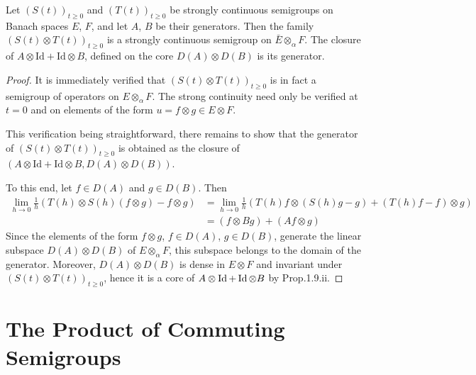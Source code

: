 \begin{proposition}\label{prop:a1-3.7}
Let $(S(t))_{t\geq 0}$ and $(T(t))_{t\geq 0}$ be strongly continuous semigroups on Banach spaces $E$, $F$, and let $A$, $B$ be their generators. 
Then the family $(S(t) \otimes T(t))_{t\geq 0}$ is a strongly continuous semigroup on $\bar{E} \otimes_{\alpha} F$.
The closure of $A \otimes \text{Id} + \text{Id} \otimes B$, defined on the core $D(A) \otimes D(B)$ is its generator.
\end{proposition}
\begin{proof}
It is immediately verified that $(S(t)\otimes T(t))_{t\geq 0}$ is in fact a semigroup of operators on $E \otimes_{\alpha} F$. 
The strong continuity need only be verified at $t = 0$ and on elements of the form $u = f \otimes g \in E \otimes F$.

This verification being straightforward, there remains to show that the generator of $(S(t)\otimes T(t))_{t\geq 0}$ is obtained as the closure of $(A \otimes \text{Id} + \text{Id} \otimes B,D(A) \otimes D(B))$.

To this end, let $f \in D(A)$ and $g \in D(B)$. 
Then
\begin{align*}
    \lim_{h\to 0} \frac{1}{h}(T(h) \otimes S(h)(f \otimes g)-f \otimes g) &= \lim_{h\to 0} \frac{1}{h}(T(h)f \otimes (S(h)g-g) + (T(h)f-f) \otimes g) \\
    &= (f \otimes Bg) + (Af \otimes g)
\end{align*}
Since the elements of the form $f \otimes g$, $f \in D(A)$, $g \in D(B)$, generate the linear subspace $D(A) \otimes D(B)$ of $E \otimes_{\alpha} F$, this subspace belongs
to the domain of the generator.
Moreover, $D(A) \otimes D(B)$ is dense in $E \otimes F$ and invariant under $(S(t)\otimes T(t))_{t\geq 0}$, hence it is a core of $A \otimes \operatorname{Id} + \operatorname{Id} \otimes B$ by Prop.1.9.ii.
\end{proof}
\section{The Product of Commuting Semigroups}\label{sec:a1-3.8}

